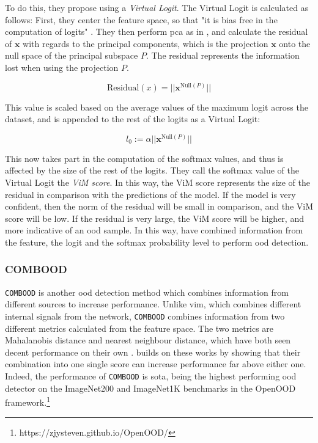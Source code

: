 \documentclass[UKenglish]{uiomasterthesis} %
\theoremstyle{definition}
\begin{document}
To do this, they propose using a {\it Virtual Logit}. The Virtual Logit is calculated as follows: First, they center the feature space, so that "it is bias free in the computation of logits" \cite{vim}. They then perform \ac{pca} as in \cite{subspace}, and calculate the residual of $\bm{x}$ with regards to the principal components, which is the projection $\bm{x}$ onto the null space of the principal subspace $P$. The residual represents the information lost when using the projection $P$.

\begin{equation}
\text{Residual}(x) = || \bm{x}^{\text{Null}(P)}||
\label{virtuallogit}
\end{equation}

This value is scaled based on the average values of the maximum logit across the dataset, and is appended to the rest of the logits as a Virtual Logit:

\begin{equation}
l_0 := \alpha || \bm{x}^{\text{Null}(P)}||
\label{virtuallogit}
\end{equation}

This now takes part in the computation of the softmax values, and thus is affected by the size of the rest of the logits. They call the softmax value of the Virtual Logit the {\it ViM score}. In this way, the ViM score represents the size of the residual in comparison with the predictions of the model. If the model is very confident, then the norm of the residual will be small in comparison, and the ViM score will be low. If the residual is very large, the ViM score will be higher, and more indicative of an \ac{ood} sample. In this way, \cite{vim} have combined information from the feature, the logit and the softmax probability level to perform \ac{ood} detection.

\subsubsection{COMBOOD}

\texttt{COMBOOD} \cite{combood} is another \ac{ood} detection method which combines information from different sources to increase performance. Unlike \ac{vim}, which combines different internal signals from the network, \texttt{COMBOOD} combines information from two different metrics calculated from the feature space. The two metrics are Mahalanobis distance and nearest neighbour distance, which have both seen decent performance on their own \cite{nearestneighbour, mahalanobis}. \cite{combood} builds on these works by showing that their combination into one single score can increase performance far above either one. Indeed, the performance of \texttt{COMBOOD} is \acl{sota}, being the highest performing \ac{ood} detector on the ImageNet200 and ImageNet1K benchmarks in the OpenOOD framework.\footnote{https://zjysteven.github.io/OpenOOD/}
\end{document}
